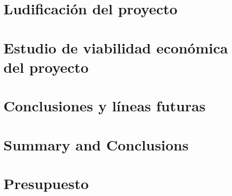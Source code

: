 \documentclass[spanish,a4paper,12pt,oneside]{extreport}
\begin{document}


\newpage{\pagestyle{empty}}
\thispagestyle{empty}

\chapter{\LARGE Ludificación del proyecto}
\label{chapter:ludificacion}



\newpage{\pagestyle{empty}}
\thispagestyle{empty}

\chapter{\LARGE Estudio de viabilidad económica del proyecto}
\label{chapter:viabilidad}



\newpage{\pagestyle{empty}}
\thispagestyle{empty}

\chapter{\LARGE Conclusiones y líneas futuras}
\label{chapter:Resultados}



\newpage{\pagestyle{empty}}
\thispagestyle{empty}

\chapter{\LARGE Summary and Conclusions}
\label{chapter:Conclusiones}



\newpage{\pagestyle{empty}}
\thispagestyle{empty}

\chapter{\LARGE Presupuesto}
\label{chapter:presupuesto}
\end{document}
